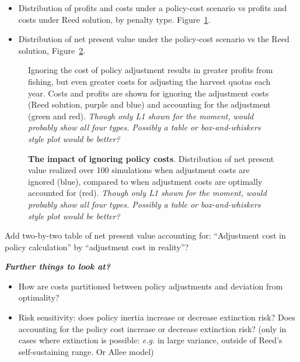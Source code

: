 \documentclass[authoryear, review, 12pt]{elsarticle}
\newcommand{\cdb}[1]{{\it \color{darkgreen} #1}}
\begin{document}
\begin{itemize}
  \item Distribution of profits and costs under a policy-cost scenario vs profits and costs under Reed solution, by penalty type. Figure~\ref{fig:profits_costs}.
  \item Distribution of net present value under the policy-cost scenario vs the Reed solution, Figure~\ref{fig:npv_dist}.  
\end{itemize}

\begin{figure}
  \begin{center}
    \caption{Ignoring the cost of policy adjustment results in greater profits from fishing, but even greater costs for adjusting the harvest quotas each year.  Costs and profits are shown for ignoring the adjustment costs (Reed solution, purple and blue) and accounting for the adjustment (green and red).  \cdb{Though only L1 shown for the moment, would probably show all four types.  Possibly a table or box-and-whiskers style plot would be better?}}\label{fig:profits_costs}
  \end{center}
\end{figure}

\begin{figure}
  \begin{center}
    \caption{\textbf{The impact of ignoring policy costs}.  Distribution of net present value realized over 100 simulations when adjustment costs are ignored (blue), compared to when adjustment costs are optimally accounted for (red). \cdb{Though only L1 shown for the moment, would probably show all four types.  Possibly a table or box-and-whiskers style plot would be better?}}\label{fig:npv_dist}
  \end{center}
\end{figure}




Add two-by-two table of net present value accounting for:  ``Adjustment cost in policy calculation'' by ``adjustment cost in reality''?

\cdb{\textbf{Further things to look at?}
\begin{itemize}
  \item How are costs partitioned between policy adjustments and deviation from optimality? 
  \item Risk sensitivity: does policy inertia increase or decrease extinction risk? Does accounting for the policy cost increase or decrease extinction risk?  (only in cases where extinction is possible: \emph{e.g.} in large variance, outside of Reed's self-sustaining range.  Or Allee model)
\end{itemize}
}
\end{document}
